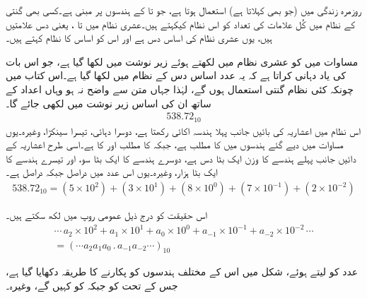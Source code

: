 

روزمرہ زندگی میں  (جو   بھی کہلاتا ہے)  استعمال ہوتا ہے، جو  تا  کے ہندسوں پر مبنی ہے۔کسی بھی گنتی کے نظام میں کُل علامات کی تعداد کو اس نظام کیکہتے ہیں۔عشری  نظام میں  تا ، یعنی دس  علامتیں  ہیں، یوں عشری  نظام کی اساس دس ہے اور اس کو اساس  کا نظام کہتے ہیں۔

	مساوات  میں  کو عشری  نظام میں لکھتے ہوئے زیر نوشت میں  لکھا گیا ہے، جو اس بات کی یاد دہانی کراتا ہے کہ یہ عدد اساس دس کے نظام میں لکھا گیا ہے۔اس کتاب میں چونکہ کئی نظام گنتی استعمال ہوں گے، لہٰذا جہاں متن سے واضح نہ ہو وہاں اعداد کے ساتھ ان کی اساس زیر نوشت میں لکھی جائے گا۔
\begin{align}\label{مساوات_ثنائی_عدد}
538.72_{10}
\end{align}
اس نظام میں اعشاریہ کی بائیں جانب پہلا ہندسہ  اکائی  رکھتا ہے، دوسرا دہائی، تیسرا سینکڑا، وغیرہ۔یوں مساوات  میں دیے گئے ہندسوں میں  کا  مطلب  ہے، جبکہ  کا مطلب  اور  کا  ہے۔اسی طرح اعشاریہ کے دائیں جانب پہلے ہندسے کا وزن ایک بٹا دس ہے، دوسرے ہندسے کا ایک بٹا سو، اور تیسرے ہندسے کا ایک بٹا ہزار، وغیرہ۔یوں اس عدد میں  دراصل  جبکہ  دراصل  ہے۔
\begin{align}\label{مساوات_ثنائی_سینکڑا}
538.72_{10}=(5\times 10^2)+(3\times 10^1)+(8\times 10^0)+(7\times 10^{-1})+(2\times 10^{-2})
\end{align}

اس حقیقت کو درج ذیل عمومی روپ میں لکھ سکتے ہیں۔
\begin{multline}\label{مساوات_ثنائی_عمومی_روپ}
\cdots \,a_2\times 10^2+a_1\times 10^1+a_0\times 10^0+a_{-1}\times 10^{-1}+a_{-2}\times 10^{-2}\, \cdots\\
=(\cdots a_2a_1a_0\, .\, a_{-1}a_{-2}\cdots)_{10}
\end{multline}

 عدد  کو  لیتے ہوئے، شکل  میں اس کے مختلف ہندسوں کو پکارنے کا طریقہ دکھایا گیا ہے، جس کے تحت  کو  جبکہ  کو  کہیں گے، وغیرہ۔

